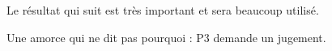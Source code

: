 Le résultat qui suit est très important et sera beaucoup utilisé.
\begin{theorem} %
  Une amorce qui ne dit pas pourquoi : P3 demande un jugement.
\end{theorem}
